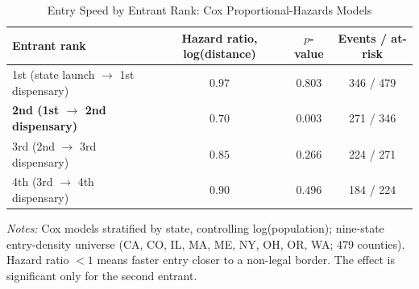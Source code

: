 \begin{table}[htbp]
\centering
\caption{Entry Speed by Entrant Rank: Cox Proportional-Hazards Models}
\label{tab:a8_hazard_rank}
\small
\begin{tabular}{lccc}
\toprule
Entrant rank & Hazard ratio, log(distance) & $p$-value & Events / at-risk \\
\midrule
1st (state launch $\to$ 1st dispensary) & $0.97$ & $0.803$ & 346 / 479 \\
\textbf{2nd (1st $\to$ 2nd dispensary)} & $\mathbf{0.70}$ & $\mathbf{0.003}$ & 271 / 346 \\
3rd (2nd $\to$ 3rd dispensary) & $0.85$ & $0.266$ & 224 / 271 \\
4th (3rd $\to$ 4th dispensary) & $0.90$ & $0.496$ & 184 / 224 \\
\bottomrule
\end{tabular}
\begin{minipage}{0.95\textwidth}
\vspace{0.3em}
\footnotesize
\textit{Notes:} Cox models stratified by state, controlling log(population); nine-state entry-density
universe (CA, CO, IL, MA, ME, NY, OH, OR, WA; 479 counties). Hazard ratio $<1$ means faster entry closer to a
non-legal border. The effect is significant only for the second entrant.
\end{minipage}
\end{table}
